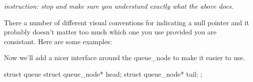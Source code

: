 \emph{instruction: stop and make sure you understand exactly what the above does.}

There a number of different visual conventions for indicating a null pointer and it probably doesn't 
matter too much which one you use provided you are consistant. 
Here are some examples:

\begin{center}
\end{center}



Now we'll add a nicer interface around the queue\_node to make it easier to use.

\begin{codeinline}
struct queue {
    struct queue_node* head;
    struct queue_node* tail;
};
\end{codeinline}

